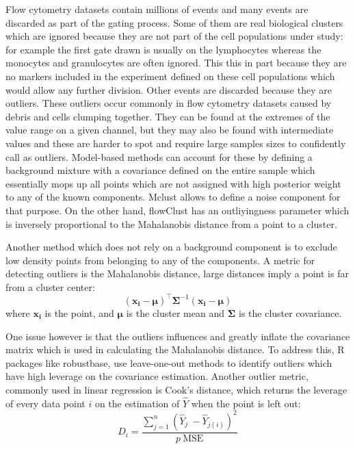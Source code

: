 Flow cytometry datasets contain millions of events and many events are discarded as part of the gating process.
Some of them are real biological clusters which are ignored because they are not part of the cell populations under study:
for example the first gate drawn is usually on the lymphocytes whereas the monocytes and granulocytes are often ignored.
This this in part because they are no markers included in the experiment defined on these cell populations which would allow any further division.
Other events are discarded because they are outliers. These outliers occur commonly in flow cytometry datasets caused by debris and cells clumping together.
They can be found at the extremes of the value range on a given channel, but they may also be found with intermediate values and these are harder to spot and require large samples sizes to confidently call as outliers.
Model-based methods can account for these by defining a background mixture with a covariance defined on the entire sample which essentially mops up all points
which are not assigned with high posterior weight to any of the known components.
Mclust allows to define a noise component for that purpose.
On the other hand, flowClust  has an outliyingness parameter which is inversely proportional to the Mahalanobis distance from a point to a cluster.


Another method which does not rely on a background component is to exclude low density points from belonging to any of the components.
A metric for detecting outliers is the Mahalanobis distance, large distances imply a point is far from a cluster center:
\[
(\boldsymbol{x_i}-\boldsymbol{\mu})^{\top}\boldsymbol{\Sigma}^{-1}(\boldsymbol{x_i}-\boldsymbol{\mu})
\]
where $\boldsymbol{x_i}$ is the point, and $\boldsymbol{\mu}$ is the cluster mean and $\boldsymbol{\Sigma}$ is the cluster covariance.

One issue however is that the outliers influences and greatly inflate the covariance matrix which is used in calculating the Mahalanobis distance.
To address this, R packages like robustbase,
use leave-one-out methods to identify outliers which have high leverage on the covariance estimation.
Another outlier metric, commonly used in linear regression is Cook's distance,
which returns the leverage of every data point $i$  on the estimation of $\hat Y$ when the point is left out:
\[
D_i = \frac{ \sum_{j=1}^n (\hat Y_j\ - \hat Y_{j(i)})^2 }{p \ \mathrm{MSE}}
\]

